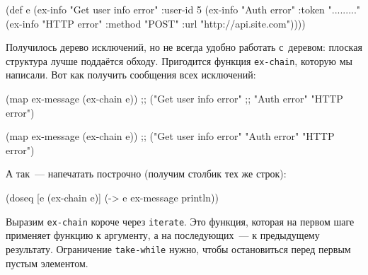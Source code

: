 \else

\begin{english}
  \begin{clojure}
(def e
  (ex-info
   "Get user info error"
   {:user-id 5}
   (ex-info "Auth error"
            {:token "........."}
            (ex-info "HTTP error"
                     {:method "POST"
                      :url "http://api.site.com"}))))
  \end{clojure}
\end{english}

\fi


Получилось дерево исключений, но не всегда удобно работать с~деревом: плоская
структура лучше поддаётся обходу. Пригодится функция \verb|ex-chain|, которую мы
написали. Вот как получить сообщения всех исключений:

\ifnarrow

\begin{english}
  \begin{clojure}
(map ex-message (ex-chain e))
;; ("Get user info error"
;;  "Auth error" "HTTP error")
  \end{clojure}
\end{english}

\else

\begin{english}
  \begin{clojure}
(map ex-message (ex-chain e))
;; ("Get user info error" "Auth error" "HTTP error")
  \end{clojure}
\end{english}

\fi

\noindent
А так~--- напечатать построчно (получим столбик тех же строк):


\begin{english}
  \begin{clojure}
(doseq [e (ex-chain e)]
  (-> e ex-message println))
  \end{clojure}
\end{english}

Выразим \verb|ex-chain| короче через \verb|iterate|. Это функция, которая на
первом шаге применяет функцию к аргументу, а на последующих~--- к предыдущему
результату. Ограничение \verb|take-while| нужно, чтобы остановиться перед первым
пустым элементом.

\ifnarrow

